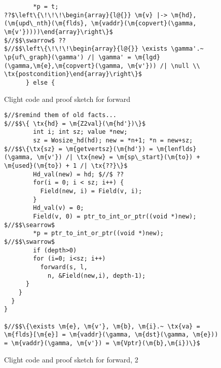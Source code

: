 \begin{figure*}[!ht]
\begin{lstlisting}
        *p = t;
??$\left\{\!\!\!\begin{array}{l@{}} \m{v} |-> \m{hd},(\m{upd\_nth}(\m{flds}, \m{vaddr}(\m{copvert}(\gamma, \m{v'}))))\end{array}\right\}$
$//$$\swarrow$ ??
$//$$\left\{\!\!\!\begin{array}{l@{}} \exists \gamma'.~ \p{uf\_graph}(\gamma') /| \gamma' = \m{lgd}(\gamma,\m{e},\m{copvert}(\gamma, \m{v'})) /| \null \\ \tx{postcondition}\end{array}\right\}$
      } else {
\end{lstlisting}
\vspace{-0.4em}
\caption{Clight code and proof sketch for forward}
\label{fig:forward}
\vspace{-1em}
\end{figure*}

\begin{figure*}[!ht]
\vspace{-1ex}
  \begin{lstlisting}
$//$remind them of old facts...
$//$$\{ \tx{hd} = \m{Z2val}(\m{hd'})\}$
        int i; int sz; value *new;
        sz = Wosize_hd(hd); new = *n+1; *n = new+sz;
$//$$\{\tx{sz} = \m{getvertsz}(\m{hd'}) = \m{lenflds}(\gamma, \m{v'}) /| \tx{new} = \m{sp\_start}(\m{to}) + \m{used}(\m{to}) + 1 /| \tx{??}\}$        
        Hd_val(new) = hd; $//$ ??
        for(i = 0; i < sz; i++) {
          Field(new, i) = Field(v, i);
        }
        Hd_val(v) = 0;
        Field(v, 0) = ptr_to_int_or_ptr((void *)new);
$//$$\searrow$
        *p = ptr_to_int_or_ptr((void *)new);
$//$$\swarrow$
        if (depth>0)
        for (i=0; i<sz; i++)
          forward(s, l, 
            n, &Field(new,i), depth-1);
      }
    }
  }
}

$//$$\{\exists \m{e}, \m{v'}, \m{b}, \m{i}.~ \tx{va} = \m{flds}[\m{e}] = \m{vaddr}(\gamma, \m{dst}(\gamma, \m{e})) = \m{vaddr}(\gamma, \m{v'}) = \m{Vptr}(\m{b},\m{i})\}$

\end{lstlisting}
\vspace{-0.4em}
\caption{Clight code and proof sketch for forward, 2}
\label{fig:forward2}
\vspace{-1em}
\end{figure*}

